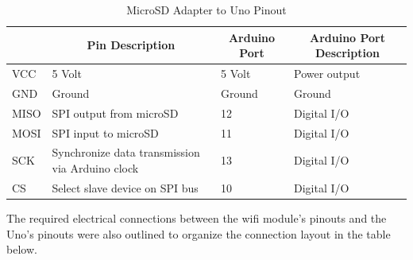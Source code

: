 \documentclass[12pt, titlepage]{article}
\begin{document}
\begin{table}[H]
  \centering
  \begin{tabular}{|p{2cm}|p{6cm}|p{2cm}|p{2cm}|}
  \hline
  \rowcolor[gray]{0.9}
  \multicolumn{1}{|c|}{\textbf{Pin Name}} & \multicolumn{1}{c|}{\textbf{Pin Description}} & \multicolumn{1}{|c|}{\textbf{Arduino Port}} & \multicolumn{1}{|c|}{\textbf{Arduino Port Description}} 
  \\ \hline
  VCC
  & 5 Volt
  & 5 Volt
  & Power output
  \newline                                
  \\ \hline

  GND                              
  & Ground
  & Ground
  & Ground
  \newline                                
  \\ \hline

  MISO                          
  & SPI output from microSD
  & 12
  & Digital I/O
  \newline                                
  \\ \hline

  MOSI                                
  & SPI input to microSD
  & 11 
  & Digital I/O
  \newline                            
  \\ \hline

  SCK                                
  & Synchronize data transmission via Arduino clock
  & 13 
  & Digital I/O
  \newline                            
  \\ \hline

  CS                                
  & Select slave device on SPI bus
  & 10 
  & Digital I/O
  \newline                            
  \\ \hline

  \end{tabular}
  \caption{MicroSD Adapter to Uno Pinout}
\end{table}


The required electrical connections between the wifi module's pinouts and the Uno's pinouts were also outlined to organize the connection layout in the table below. \\
\end{document}
